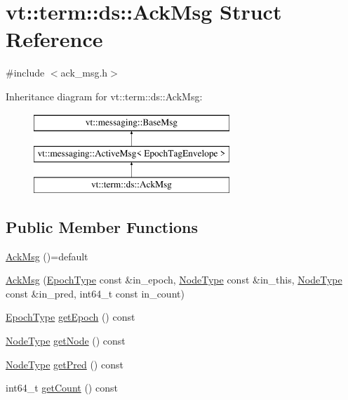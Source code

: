 \hypertarget{structvt_1_1term_1_1ds_1_1_ack_msg}{}\section{vt\+:\+:term\+:\+:ds\+:\+:Ack\+Msg Struct Reference}
\label{structvt_1_1term_1_1ds_1_1_ack_msg}


{\ttfamily \#include $<$ack\+\_\+msg.\+h$>$}

Inheritance diagram for vt\+:\+:term\+:\+:ds\+:\+:Ack\+Msg\+:\begin{figure}[H]
\begin{center}
\leavevmode
\includegraphics[height=3.000000cm]{structvt_1_1term_1_1ds_1_1_ack_msg}
\end{center}
\end{figure}
\subsection*{Public Member Functions}
\begin{DoxyCompactItemize}
\item 
\hyperlink{structvt_1_1term_1_1ds_1_1_ack_msg_aa455e4d0c3e93b196e8fc21f576a5d3e}{Ack\+Msg} ()=default
\item 
\hyperlink{structvt_1_1term_1_1ds_1_1_ack_msg_afa493ae15ad599ef9ed892ab697345d5}{Ack\+Msg} (\hyperlink{namespacevt_a81d11b28122d43bf9834577e4a06440f}{Epoch\+Type} const \&in\+\_\+epoch, \hyperlink{namespacevt_a866da9d0efc19c0a1ce79e9e492f47e2}{Node\+Type} const \&in\+\_\+this, \hyperlink{namespacevt_a866da9d0efc19c0a1ce79e9e492f47e2}{Node\+Type} const \&in\+\_\+pred, int64\+\_\+t const in\+\_\+count)
\item 
\hyperlink{namespacevt_a81d11b28122d43bf9834577e4a06440f}{Epoch\+Type} \hyperlink{structvt_1_1term_1_1ds_1_1_ack_msg_ac8a4b1762cef1c6c9de8951f47e6abc0}{get\+Epoch} () const
\item 
\hyperlink{namespacevt_a866da9d0efc19c0a1ce79e9e492f47e2}{Node\+Type} \hyperlink{structvt_1_1term_1_1ds_1_1_ack_msg_ab1da752b167852eeb014b1abe78b61be}{get\+Node} () const
\item 
\hyperlink{namespacevt_a866da9d0efc19c0a1ce79e9e492f47e2}{Node\+Type} \hyperlink{structvt_1_1term_1_1ds_1_1_ack_msg_aee8c447d40b6aebf018a7402527a355e}{get\+Pred} () const
\item 
int64\+\_\+t \hyperlink{structvt_1_1term_1_1ds_1_1_ack_msg_a28125b7b99d15c26ebaef2c34f6a5daa}{get\+Count} () const
\end{DoxyCompactItemize}

